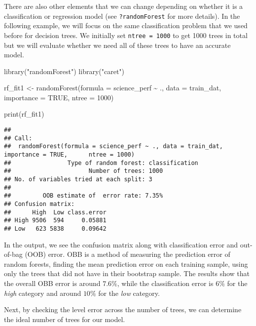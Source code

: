 \documentclass[
]{book}
\newenvironment{Shaded}{\begin{snugshade}}{\end{snugshade}}
\newcommand{\AttributeTok}[1]{\textcolor[rgb]{0.77,0.63,0.00}{#1}}
\newcommand{\ConstantTok}[1]{\textcolor[rgb]{0.00,0.00,0.00}{#1}}
\newcommand{\DecValTok}[1]{\textcolor[rgb]{0.00,0.00,0.81}{#1}}
\newcommand{\FunctionTok}[1]{\textcolor[rgb]{0.00,0.00,0.00}{#1}}
\newcommand{\NormalTok}[1]{#1}
\newcommand{\OtherTok}[1]{\textcolor[rgb]{0.56,0.35,0.01}{#1}}
\newcommand{\SpecialCharTok}[1]{\textcolor[rgb]{0.00,0.00,0.00}{#1}}
\newcommand{\StringTok}[1]{\textcolor[rgb]{0.31,0.60,0.02}{#1}}
\begin{document}
There are also other elements that we can change depending on whether it is a classification or regression model (see \texttt{?randomForest} for more details). In the following example, we will focus on the same classification problem that we used before for decision trees. We initially set \texttt{ntree\ =\ 1000} to get 1000 trees in total but we will evaluate whether we need all of these trees to have an accurate model.

\begin{Shaded}
\begin{Highlighting}[]
\FunctionTok{library}\NormalTok{(}\StringTok{"randomForest"}\NormalTok{)}
\FunctionTok{library}\NormalTok{(}\StringTok{"caret"}\NormalTok{)}

\NormalTok{rf\_fit1 }\OtherTok{\textless{}{-}} \FunctionTok{randomForest}\NormalTok{(}\AttributeTok{formula =}\NormalTok{ science\_perf }\SpecialCharTok{\textasciitilde{}}\NormalTok{ .,}
                        \AttributeTok{data =}\NormalTok{ train\_dat,}
                        \AttributeTok{importance =} \ConstantTok{TRUE}\NormalTok{, }\AttributeTok{ntree =} \DecValTok{1000}\NormalTok{)}

\FunctionTok{print}\NormalTok{(rf\_fit1)}
\end{Highlighting}
\end{Shaded}

\begin{verbatim}
## 
## Call:
##  randomForest(formula = science_perf ~ ., data = train_dat, importance = TRUE,      ntree = 1000) 
##                Type of random forest: classification
##                      Number of trees: 1000
## No. of variables tried at each split: 3
## 
##         OOB estimate of  error rate: 7.35%
## Confusion matrix:
##      High  Low class.error
## High 9506  594     0.05881
## Low   623 5838     0.09642
\end{verbatim}

In the output, we see the confusion matrix along with classification error and out-of-bag (OOB) error. OBB is a method of measuring the prediction error of random forests, finding the mean prediction error on each training sample, using only the trees that did not have in their bootstrap sample. The results show that the overall OBB error is around \(7.6\%\), while the classification error is \(6\%\) for the \emph{high} category and around \(10\%\) for the \emph{low} category.

Next, by checking the level error across the number of trees, we can determine the ideal number of trees for our model.
\end{document}
